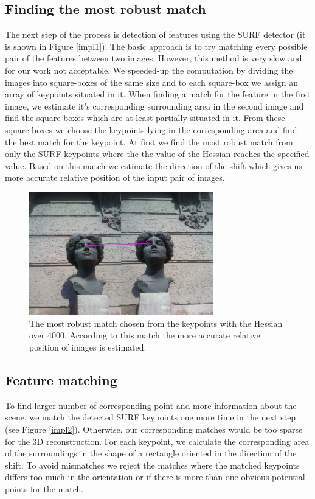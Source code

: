 \subsection{Finding the most robust match}
The next step of the process is detection of features using the SURF detector (it is shown in Figure \ref{impl1}).
The basic approach is to try matching every possible pair of the features between two images.
However, this method is very slow and for our work not acceptable.
We speeded-up the computation by dividing the images into square-boxes of the same size and to each square-box we assign an array of keypoints situated in it.
When finding a match for the feature in the first image, we estimate it's corresponding surrounding area in the second image 
and find the square-boxes which are at least partially situated in it.
From these square-boxes we choose the keypoints lying in the corresponding area and find the best match for the keypoint.
At first we find the most robust match from only the SURF keypoints where the the value of the Hessian reaches the specified value.
Based on this match we estimate the direction of the shift which gives us more accurate relative position of the input pair of images.

\begin{figure}[H]
\centerline{
\includegraphics[width=8cm]{img/ema_direction.png}}
\caption{The most robust match chosen from the keypoints with the Hessian over 4000. According to this match the more accurate relative position of images is estimated.}
\label{fig:robust_match}
\end{figure}

\subsection{Feature matching}
To find larger number of corresponding point and more information about the scene, we match the detected SURF keypoints one more time in the next step (see Figure \ref{impl2}).
Otherwise, our corresponding matches would be too sparse for the 3D reconstruction.
For each keypoint, we calculate the corresponding area of the surroundings in the shape of a rectangle oriented in the direction of the shift.
To avoid mismatches we reject the matches where the matched keypoints differs too much in the orientation or if there is more than one obvious potential points for the match.

